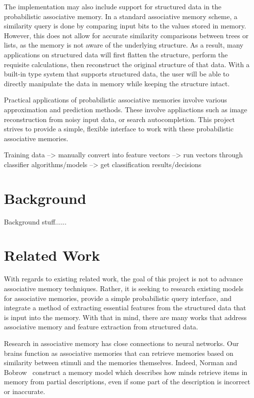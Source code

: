 \documentclass{sig-alternate}
\begin{document}

The implementation may also include support for structured data in the probabilistic associative memory.
In a standard associative memory scheme, a similarity query is done by comparing input bits
to the values stored in memory. However, this does not allow for accurate similarity comparisons
between trees or lists, as the memory is not aware of the underlying structure. As a result,
many applications on structured data will first flatten the structure, perform the requisite 
calculations, then reconstruct the original structure of that data. With a built-in type system
that supports structured data, the user will be able to directly manipulate the data in memory 
while keeping the structure intact.

Practical applications of probabilistic associative memories involve various approximation and prediction methods.
These involve appliactions such as image reconstruction from noisy input data, or search autocompletion.
This project strives to provide a simple, flexible interface to work with these probabilistic associative memories.

Training data --> manually convert into feature vectors --> run vectors through classifier algorithms/models --> get classification results/decisions

\section{Background}
\label{sec:intro}
Background stuff......

\section{Related Work}
\label{sec:related_work}

With regards to existing related work, the goal of this project is not to advance associative memory 
techniques. Rather, it is seeking to research existing models for associative memories, provide a 
simple probabilistic query interface, and integrate a method of extracting essential features from 
the structured data that is input into the memory. With that in mind, there are many works that 
address associative memory and feature extraction from structured data.

Research in associative memory has close connections to neural networks. Our brains function as 
associative memories that can retrieve memories based on similarity between stimuli and the memories 
themselves.  Indeed, Norman and Bobrow~\cite{bobrow} construct a memory model which describes how 
minds retrieve items in memory from partial descriptions, even if some part of the description is 
incorrect or inaccurate. 
\end{document}
